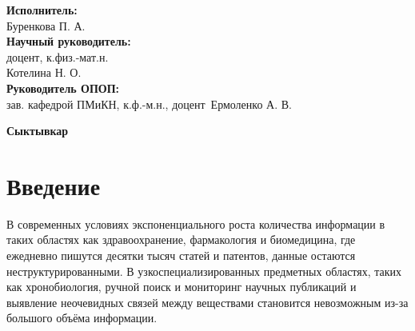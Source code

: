 \documentclass{syksu-coursework}
\begin{document}
\begin{titlepage}
    \noindent
    {\bfseries\fontsize{12pt}{14pt}\selectfont Исполнитель:}\\
    {\fontsize{12pt}{14pt}\selectfont Буренкова П. А. \underline{\hspace{6cm}}}\\
    {\bfseries\fontsize{12pt}{14pt}\selectfont Научный руководитель:}\\
    {\fontsize{12pt}{14pt}\selectfont доцент, к.физ.-мат.н.}\\
    {\fontsize{12pt}{14pt}\selectfont Котелина Н. О. \underline{\hspace{6cm}}}\\
    {\bfseries\fontsize{12pt}{14pt}\selectfont Руководитель ОПОП:}\\
    {\fontsize{12pt}{14pt}\selectfont зав. кафедрой ПМиКН, к.ф.-м.н., доцент}\
    {\fontsize{12pt}{14pt}\selectfont Ермоленко А. В. \underline{\hspace{6cm}}}\\

    \begin{center}
        {\bfseries\fontsize{12pt}{14pt}\selectfont Сыктывкар}\\[0.1cm]
        {\bfseries\fontsize{12pt}{14pt}\selectfont 2026}
    \end{center}

\end{titlepage}
\newpage

\setcounter{page}{2}
\tableofcontents
\newpage

\section*{Введение}

В современных условиях экспоненциального роста количества информации в таких областях как здравоохранение, фармакология и биомедицина, где ежедневно пишутся десятки тысяч статей и патентов, данные остаются неструктурированными. В узкоспециализированных предметных областях, таких как хронобиология, ручной поиск и мониторинг научных публикаций и выявление неочевидных связей между веществами становится невозможным из-за большого объёма информации.
\end{document}
